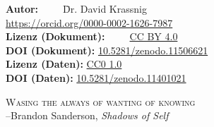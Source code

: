 \begin{tabbing}
\noindent\textbf{Autor:}~~~~~\=Dr. David Krassnig\\
\> \url{https://orcid.org/0000-0002-1626-7987}\\[\baselineskip]
\textbf{Lizenz (Dokument):}~~~~~\= \href{https://creativecommons.org/licenses/by/4.0/deed.de}{CC BY 4.0}\\
\textbf{DOI (Dokument):}\> \href{https://www.doi.org/10.5281/zenodo.11506621}{10.5281/zenodo.11506621}\\[.5\baselineskip]
\textbf{Lizenz (Daten):}\> \href{https://creativecommons.org/publicdomain/zero/1.0/deed.de}{CC0 1.0}\\
\textbf{DOI (Daten):}\> \href{https://www.doi.org/10.5281/zenodo.11401021}{10.5281/zenodo.11401021}
\end{tabbing}\newpage
\thispagestyle{empty}
\hbox{}
\vspace{30mm}
\begin{flushright}
{\LARGE\scshape Wasing the always of wanting of knowing}\\[.5\baselineskip]
{\footnotesize --Brandon Sanderson, \textit{Shadows of Self}}
\end{flushright}
\vfill
\hbox{}
\enlargethispage{30mm}
\vfill
\begin{figure}[b]
  \centering
\resizebox{22.5mm}{!}{}
\end{figure}
\restoregeometry